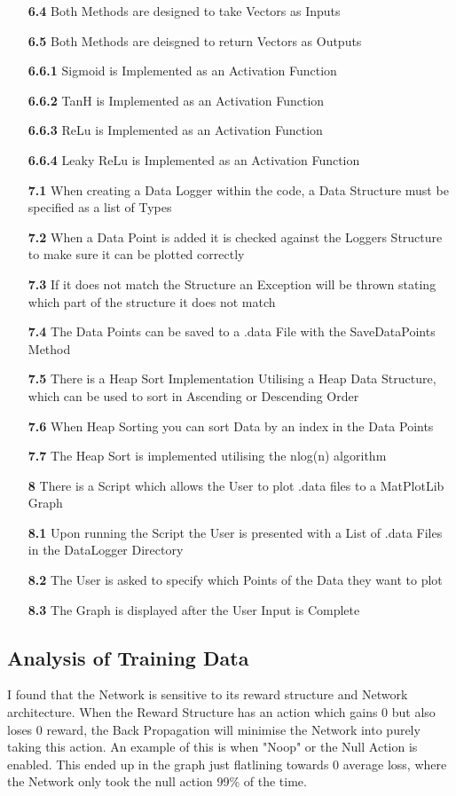 \begin{flushleft}
\begin{itemize}
            \item[\textbf{6.4}] Both Methods are designed to take Vectors as Inputs
            \item[\textbf{6.5}] Both Methods are deisgned to return Vectors as Outputs
            \item[\textbf{6.6.1}] Sigmoid is Implemented as an Activation Function
            \item[\textbf{6.6.2}] TanH is Implemented as an Activation Function
            \item[\textbf{6.6.3}] ReLu is Implemented as an Activation Function
            \item[\textbf{6.6.4}] Leaky ReLu is Implemented as an Activation Function
            \item[\textbf{7.1}] When creating a Data Logger within the code, a Data Structure must be specified as a list of Types
            \item[\textbf{7.2}] When a Data Point is added it is checked against the Loggers Structure to make sure it can be plotted correctly
            \item[\textbf{7.3}] If it does not match the Structure an Exception will be thrown stating which part of the structure it does not match
            \item[\textbf{7.4}] The Data Points can be saved to a .data File with the \textsf{SaveDataPoints} Method
            \item[\textbf{7.5}] There is a Heap Sort Implementation Utilising a Heap Data Structure, which can be used to sort in Ascending or Descending Order
            \item[\textbf{7.6}] When Heap Sorting you can sort Data by an index in the Data Points
            \item[\textbf{7.7}] The Heap Sort is implemented utilising the nlog(n) algorithm
            \item[\textbf{8}] There is a Script which allows the User to plot .data files to a MatPlotLib Graph
            \item[\textbf{8.1}] Upon running the Script the User is presented with a List of .data Files in the DataLogger Directory
            \item[\textbf{8.2}] The User is asked to specify which Points of the Data they want to plot
            \item[\textbf{8.3}] The Graph is displayed after the User Input is Complete
        \end{itemize}
    \subsection{Analysis of Training Data}
        I found that the Network is sensitive to its reward structure and Network architecture. When the Reward Structure has an action which
        gains 0 but also loses 0 reward, the Back Propagation will minimise the Network into purely taking this action. An example of this
        is when "Noop" or the Null Action is enabled. This ended up in the graph just flatlining towards 0 average loss, where the Network
        only took the null action 99\% of the time. 


\end{flushleft}
